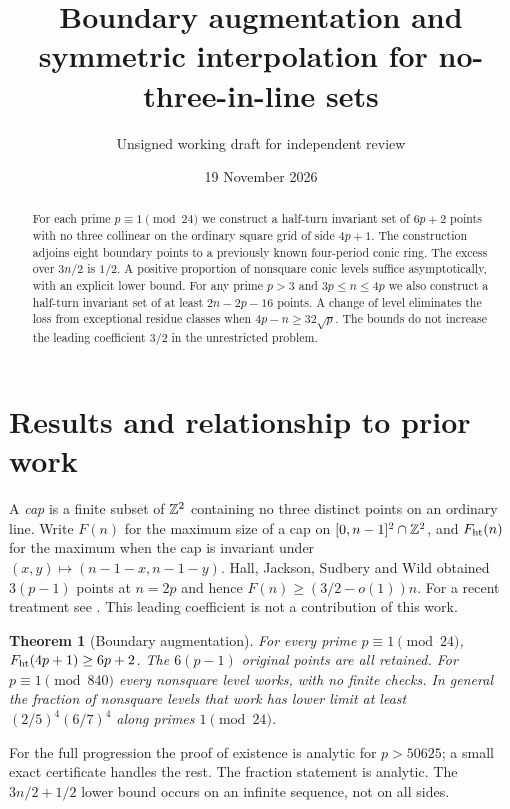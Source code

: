 \documentclass[11pt]{article}
\title{Boundary augmentation and symmetric interpolation for no-three-in-line sets}
\author{Unsigned working draft for independent review}
\date{19 November 2026}
\newtheorem{theorem}{Theorem}[section]\newtheorem{lemma}[theorem]{Lemma}\newtheorem{proposition}[theorem]{Proposition}\newtheorem{corollary}[theorem]{Corollary}
\begin{document}
\maketitle
\begin{abstract}\noindent
For each prime $p\equiv1\pmod{24}$ we construct a half-turn invariant set of $6p+2$ points with no three collinear on the ordinary square grid of side $4p+1$. The construction adjoins eight boundary points to a previously known four-period conic ring. The excess over $3n/2$ is $1/2$. A positive proportion of nonsquare conic levels suffice asymptotically, with an explicit lower bound. For any prime $p>3$ and $3p\le n\le4p$ we also construct a half-turn invariant set of at least $2n-2p-16$ points. A change of level eliminates the loss from exceptional residue classes when $4p-n\ge32\sqrt p$. The bounds do not increase the leading coefficient $3/2$ in the unrestricted problem.
\end{abstract}

\section{Results and relationship to prior work}
A \emph{cap} is a finite subset of $\mathbb Z^2$ containing no three distinct points on an ordinary line. Write $F(n)$ for the maximum size of a cap on $[0,n-1]^2\cap\mathbb Z^2$, and $F_{\rm ht}(n)$ for the maximum when the cap is invariant under $(x,y)\mapsto(n-1-x,n-1-y)$. Hall, Jackson, Sudbery and Wild \cite{hjsw} obtained $3(p-1)$ points at $n=2p$ and hence $F(n)\ge(3/2-o(1))n$. For a recent treatment see \cite[Theorems 1.2 and 2.8]{kns}. This leading coefficient is not a contribution of this work.

\begin{theorem}[Boundary augmentation]\label{thm:boundary}
For every prime $p\equiv1\pmod{24}$, $F_{\rm ht}(4p+1)\ge6p+2$. The $6(p-1)$ original points are all retained. For $p\equiv1\pmod{840}$ every nonsquare level works, with no finite checks. In general the fraction of nonsquare levels that work has lower limit at least $(2/5)^4(6/7)^4$ along primes $1\pmod{24}$.
\end{theorem}
For the full progression the proof of existence is analytic for $p>50625$; a small exact certificate handles the rest. The fraction statement is analytic. The $3n/2+1/2$ lower bound occurs on an infinite sequence, not on all sides.
\end{document}
